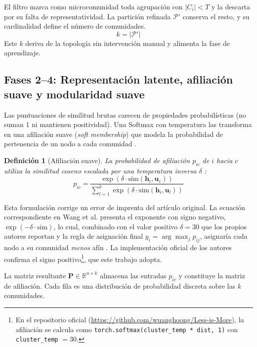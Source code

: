 \documentclass[twoside,twocolumn,10pt]{article}
\newtheorem{definition}{Definición}
\begin{document}
El filtro marca como microcomunidad toda agrupación con $|C_i| < T$ y la descarta por su falta de representatividad. La partición refinada $\mathcal{P}'$ conserva el resto, y su cardinalidad define el número de comunidades.
\begin{equation}
k = |\mathcal{P}'|
\end{equation}
Este $k$ deriva de la topología sin intervención manual y alimenta la fase de aprendizaje.

\subsection{Fases 2--4: Representación latente, afiliación suave y modularidad suave}
\label{sec:fases-2-4}

Las puntuaciones de similitud brutas carecen de propiedades probabilísticas (no suman 1 ni mantienen positividad). Una Softmax con temperatura las transforma en una afiliación suave (\textit{soft membership}) que modela la probabilidad de pertenencia de un nodo a cada comunidad \cite{Wang2025}.

\begin{definition}[Afiliación suave]
\label{def:afiliacion-suave}
La probabilidad de afiliación $p_{ic}$ de $i$ hacia $c$ utiliza la similitud coseno escalada por una temperatura inversa $\delta$ \cite{Wang2025}:
\begin{equation}
p_{ic} = \frac{\exp(\delta \cdot \text{sim}(\mathbf{h}_i, \mathbf{u}_c))}{\sum_{l=1}^{k} \exp(\delta \cdot \text{sim}(\mathbf{h}_i, \mathbf{u}_l))}
\end{equation}
\end{definition}

Esta formulación corrige un error de imprenta del artículo original. La ecuación correspondiente en Wang et al. presenta el exponente con signo negativo, $\exp(-\delta \cdot \text{sim})$, lo cual, combinado con el valor positivo $\delta = 30$ que los propios autores reportan y la regla de asignación final $y_i = \arg\max_j p_{ij}$, asignaría cada nodo a su comunidad \emph{menos} afín \cite{Wang2025}. La implementación oficial de los autores confirma el signo positivo\footnote{En el repositorio oficial (\url{https://github.com/wuanghoong/Less-is-More}), la afiliación se calcula como \texttt{torch.softmax(cluster\_temp * dist, 1)} con \texttt{cluster\_temp} $= 30$.}, que este trabajo adopta.

La matriz resultante $\mathbf{P} \in \mathbb{R}^{n \times k}$ almacena las entradas $p_{ic}$ y constituye la matriz de afiliación. Cada fila es una distribución de probabilidad discreta sobre las $k$ comunidades.
\end{document}
